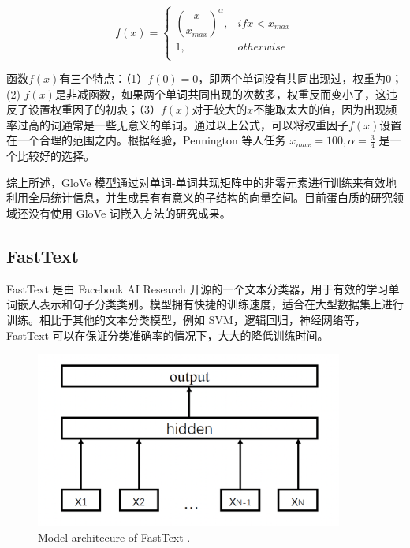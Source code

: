 \begin{equation}
 f(x) = \left\{
    \begin{array}{lr}
    (\dfrac{x}{x_{max}})^\alpha, & if x < x_{max} \\
    1, & otherwise\\
    \end{array}
\right.
\tag{3-5}
\end{equation}

函数$f(x)$有三个特点：（1）$f(0) = 0$，即两个单词没有共同出现过，权重为0；(2) $f(x)$是非减函数，如果两个单词共同出现的次数多，权重反而变小了，这违反了设置权重因子的初衷；（3）$f(x)$对于较大的$x$不能取太大的值，因为出现频率过高的词通常是一些无意义的单词。通过以上公式，可以将权重因子$f(x)$设置在一个合理的范围之内。根据经验，Pennington 等人任务 $x_{max} = 100, \alpha = \frac{3}{4}$ 是一个比较好的选择。 

综上所述，GloVe 模型通过对单词-单词共现矩阵中的非零元素进行训练来有效地利用全局统计信息，并生成具有有意义的子结构的向量空间。目前蛋白质的研究领域还没有使用 GloVe 词嵌入方法的研究成果。

\subsection{FastText}

FastText \cite{joulin2016bag} 是由 Facebook AI Research 开源的一个文本分类器，用于有效的学习单词嵌入表示和句子分类类别。模型拥有快捷的训练速度，适合在大型数据集上进行训练。相比于其他的文本分类模型，例如 SVM，逻辑回归，神经网络等，FastText 可以在保证分类准确率的情况下，大大的降低训练时间。


\begin{figure}[!htp]
\centering
\includegraphics[width=0.9\textwidth]  {imgs/fasttext.png} \\
    {Model architecure of FastText \cite{joulin2016bag}.}
\label{fig:fasttext}
\end{figure}

